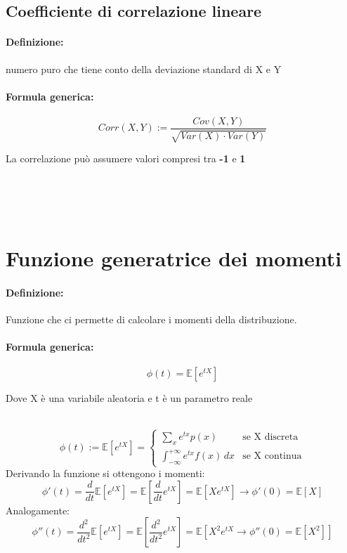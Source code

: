 \documentclass[]{article}
\newcommand{\ev}{\mathbb{E}[X]}
\renewcommand{\ev}[1]{\mathbb{E}[#1]}
\newcommand{\definizione}{\paragraph{Definizione:}}
\newcommand{\formula}{\paragraph{Formula generica:}}
\begin{document}
    \subsection{Coefficiente di correlazione lineare}
    \definizione numero puro che tiene conto della deviazione standard di X e Y
    \formula
    \begin{equation*}
        Corr(X,Y) := \frac{Cov(X,Y)}{\sqrt{Var(X) \cdot Var(Y)}}
    \end{equation*}

    \begin{center}
        La correlazione può assumere valori compresi tra \textbf{-1} e \textbf{1}
    \end{center}
     \\
     \\
     \\

    \newpage
    \section{Funzione generatrice dei momenti}
    \definizione Funzione che ci permette di calcolare i momenti della distribuzione.
    \formula \[ \phi(t) = \ev{e^{tX}}\]
    \centerline{Dove X è una variabile aleatoria e t è un parametro reale} \\
    \begin{equation*}
        \phi(t) := \ev{e^{tX}} = 
        \displaystyle
        \begin{cases}
            \displaystyle \sum_{x}^{} e^{tx}p(x) & \text{se X discreta} \\
            \displaystyle \int_{-\infty}^{+\infty} e^{tx} f(x) \, dx & \text{se X continua}
        \end{cases}
    \end{equation*}
    \linebreak[10]
    Derivando la funzione si ottengono i momenti:
    \[ \phi'(t) = \frac{d}{dt} \ev{e^{tX}} = \ev{\frac{d}{dt} e^{tX}} = \ev{Xe^{tX}} \longrightarrow \phi'(0) = \ev{X}\]
    \linebreak[10]
    Analogamente:
    \[ \phi''(t) = \frac{d^2}{dt^2} \ev{e^{tX}} = \ev{\frac{d^2}{dt^2} e^{tX}} = \ev{X^2e^{tX} \longrightarrow \phi''(0) = \ev{X^2}}\]
\end{document}
